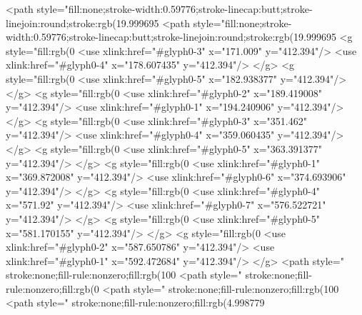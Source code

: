 <path style="fill:none;stroke-width:0.59776;stroke-linecap:butt;stroke-linejoin:round;stroke:rgb(19.999695%
<path style="fill:none;stroke-width:0.59776;stroke-linecap:butt;stroke-linejoin:round;stroke:rgb(19.999695%
<g style="fill:rgb(0%
  <use xlink:href="#glyph0-3" x="171.009" y="412.394"/>
  <use xlink:href="#glyph0-4" x="178.607435" y="412.394"/>
</g>
<g style="fill:rgb(0%
  <use xlink:href="#glyph0-5" x="182.938377" y="412.394"/>
</g>
<g style="fill:rgb(0%
  <use xlink:href="#glyph0-2" x="189.419008" y="412.394"/>
  <use xlink:href="#glyph0-1" x="194.240906" y="412.394"/>
</g>
<g style="fill:rgb(0%
  <use xlink:href="#glyph0-3" x="351.462" y="412.394"/>
  <use xlink:href="#glyph0-4" x="359.060435" y="412.394"/>
</g>
<g style="fill:rgb(0%
  <use xlink:href="#glyph0-5" x="363.391377" y="412.394"/>
</g>
<g style="fill:rgb(0%
  <use xlink:href="#glyph0-1" x="369.872008" y="412.394"/>
  <use xlink:href="#glyph0-6" x="374.693906" y="412.394"/>
</g>
<g style="fill:rgb(0%
  <use xlink:href="#glyph0-4" x="571.92" y="412.394"/>
  <use xlink:href="#glyph0-7" x="576.522721" y="412.394"/>
</g>
<g style="fill:rgb(0%
  <use xlink:href="#glyph0-5" x="581.170155" y="412.394"/>
</g>
<g style="fill:rgb(0%
  <use xlink:href="#glyph0-2" x="587.650786" y="412.394"/>
  <use xlink:href="#glyph0-1" x="592.472684" y="412.394"/>
</g>
<path style=" stroke:none;fill-rule:nonzero;fill:rgb(100%
<path style=" stroke:none;fill-rule:nonzero;fill:rgb(0%
<path style=" stroke:none;fill-rule:nonzero;fill:rgb(100%
<path style=" stroke:none;fill-rule:nonzero;fill:rgb(4.998779%
